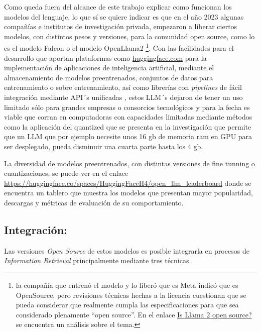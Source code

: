 \documentclass[
  12pt,
  openany]{book}
\begin{document}
Como queda fuera del alcance de este trabajo explicar como funcionan los modelos del lenguaje, lo que sí se quiere indicar es que en el año 2023 algunas compañías e institutos de investigación privada, empezaron a liberar ciertos modelos, con distintos pesos y versiones, para la comunidad open source, como lo es el modelo Falcon \citep{penedo2023} o el modelo OpenLlama2 \citep{touvron2023} \footnote{la compañía que entrenó el modelo y lo liberó que es Meta indicó que es OpenSource, pero revisiones técnicas hechas a la licencia cuestionan que se pueda considerar que realmente cumpla las especificaciones para que sea considerado plenamente ``open source''. En el enlace \href{https://opensourceconnections.com/blog/2023/07/19/is-llama-2-open-source-no-and-perhaps-we-need-a-new-definition-of-open/}{Is Llama 2 open source?} se encuentra un análisis sobre el tema.}. Con las facilidades para el desarrollo que aportan plataformas como \url{huggingface.com} para la implementación de aplicaciones de inteligencia artificial, mediante el almacenamiento de modelos preentrenados, conjuntos de datos para entrenamiento o sobre entrenamiento, así como librerías con \emph{pipelines} de fácil integración mediante API´s unificadas \citep{wolf2019}, estos LLM´s dejaron de tener un uso limitado sólo para grandes empresas o consorcios tecnológicos y para la fecha es viable que corran en computadoras con capacidades limitadas mediante métodos como la aplicación del quantized que se presenta en la investigación \citep{dettmers2023} que permite que un LLM que por ejemplo necesite unos 16 gb de memoria ram en GPU para ser desplegado, pueda disminuir una cuarta parte hasta los 4 gb.

La diversidad de modelos preentrenados, con distintas versiones de fine tunning o cuantizaciones, se puede ver en el enlace \citep{openllm} \url{https://huggingface.co/spaces/HuggingFaceH4/open_llm_leaderboard} donde se encuentra un tablero que muestra los modelos que presentan mayor popularidad, descargas y métricas de evaluación de su comportamiento.

\hypertarget{int}{%
\subsection{Integración:}\label{int}}

Las versiones \emph{Open Source} de estos modelos es posible integrarla en procesos de \emph{Information Retrieval} principalmente mediante tres técnicas.
\end{document}

